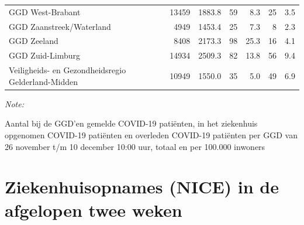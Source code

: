\documentclass[
  english,
  man,floatsintext]{apa6}
\begin{document}
\begin{table}
\begin{threeparttable}
\begin{tabular}{lrrrrrr}
GGD West-Brabant & 13459 & 1883.8 & 59 & 8.3 & 25 & 3.5\\
GGD Zaanstreek/Waterland & 4949 & 1453.4 & 25 & 7.3 & 8 & 2.3\\
GGD Zeeland & 8408 & 2173.3 & 98 & 25.3 & 16 & 4.1\\
GGD Zuid-Limburg & 14934 & 2509.3 & 82 & 13.8 & 56 & 9.4\\
Veiligheids- en Gezondheidsregio Gelderland-Midden & 10949 & 1550.0 & 35 & 5.0 & 49 & 6.9\\
\bottomrule
\end{tabular}
\begin{tablenotes}
\item \textit{Note: } 
\item Aantal bij de GGD’en gemelde COVID-19 patiënten, in het ziekenhuis opgenomen COVID-19 patiënten en overleden COVID-19 patiënten per GGD van 26 november t/m 10 december 10:00 uur, totaal en per 100.000 inwoners
\end{tablenotes}
\end{threeparttable}
\endgroup{}
\end{table}

\newpage

\hypertarget{ziekenhuisopnames-nice-in-de-afgelopen-twee-weken}{%
\section{Ziekenhuisopnames (NICE) in de afgelopen twee weken}\label{ziekenhuisopnames-nice-in-de-afgelopen-twee-weken}}
\end{document}
